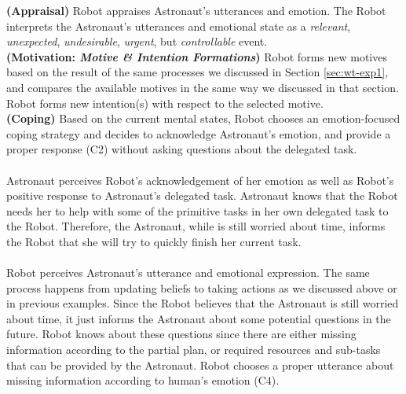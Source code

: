 \noindent\textbf{(Appraisal)} Robot appraises Astronaut's utterances and
emotion. The Robot interprets the Astronaut's utterances and emotional state as
a \textit{relevant}, \textit{unexpected}, \textit{undesirable}, \textit{urgent},
but \textit{controllable} event.\\

\noindent\textbf{(Motivation: \textit{Motive \& Intention Formations})} Robot
forms new motives based on the result of the same processes we discussed in
Section \ref{sec:wt-exp1}, and compares the available motives in the same way
we discussed in that section. Robot forms new intention(s) with respect to the
selected motive.\\

\noindent\textbf{(Coping)} Based on the current mental states, Robot chooses an
emotion-focused coping strategy and decides to acknowledge Astronaut's emotion,
and provide a proper response (C2) without asking questions about the delegated
task.\\

\noindent{}\\

Astronaut perceives Robot's acknowledgement of her emotion as well as Robot's
positive response to Astronaut's delegated task. Astronaut knows that the
Robot needs her to help with some of the primitive tasks in her own delegated
task to the Robot. Therefore, the Astronaut, while is still worried about
time, informs the Robot that she will try to quickly finish her current task.\\

\noindent{}\\

Robot perceives Astronaut's utterance and emotional expression. The same process
happens from updating beliefs to taking actions as we discussed above or in
previous examples. Since the Robot believes that the Astronaut is still worried
about time, it just informs the Astronaut about some potential questions in the
future. Robot knows about these questions since there are either missing
information according to the partial plan, or required resources and sub-tasks
that can be provided by the Astronaut. Robot chooses a proper utterance about
missing information according to human's emotion (C4).\\

